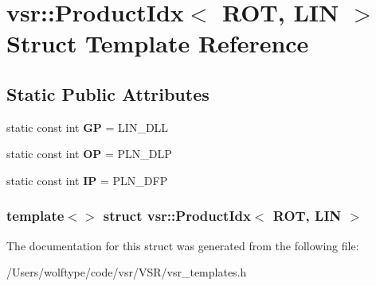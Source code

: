 \hypertarget{structvsr_1_1_product_idx_3_01_r_o_t_00_01_l_i_n_01_4}{\section{vsr\-:\-:Product\-Idx$<$ R\-O\-T, L\-I\-N $>$ Struct Template Reference}
\label{structvsr_1_1_product_idx_3_01_r_o_t_00_01_l_i_n_01_4}
}
\subsection*{Static Public Attributes}
\begin{DoxyCompactItemize}
\item 
\hypertarget{structvsr_1_1_product_idx_3_01_r_o_t_00_01_l_i_n_01_4_a8dcdf40d64f307161794af39af5f5874}{static const int {\bfseries G\-P} = L\-I\-N\-\_\-\-D\-L\-L}\label{structvsr_1_1_product_idx_3_01_r_o_t_00_01_l_i_n_01_4_a8dcdf40d64f307161794af39af5f5874}

\item 
\hypertarget{structvsr_1_1_product_idx_3_01_r_o_t_00_01_l_i_n_01_4_a88e1602740bc8e7d4b3d006e0a3f017f}{static const int {\bfseries O\-P} = P\-L\-N\-\_\-\-D\-L\-P}\label{structvsr_1_1_product_idx_3_01_r_o_t_00_01_l_i_n_01_4_a88e1602740bc8e7d4b3d006e0a3f017f}

\item 
\hypertarget{structvsr_1_1_product_idx_3_01_r_o_t_00_01_l_i_n_01_4_a56f7a76e0d4b33cd49bee9b894850d59}{static const int {\bfseries I\-P} = P\-L\-N\-\_\-\-D\-F\-P}\label{structvsr_1_1_product_idx_3_01_r_o_t_00_01_l_i_n_01_4_a56f7a76e0d4b33cd49bee9b894850d59}

\end{DoxyCompactItemize}
\subsubsection*{template$<$$>$ struct vsr\-::\-Product\-Idx$<$ R\-O\-T, L\-I\-N $>$}



The documentation for this struct was generated from the following file\-:\begin{DoxyCompactItemize}
\item 
/\-Users/wolftype/code/vsr/\-V\-S\-R/vsr\-\_\-templates.\-h\end{DoxyCompactItemize}

